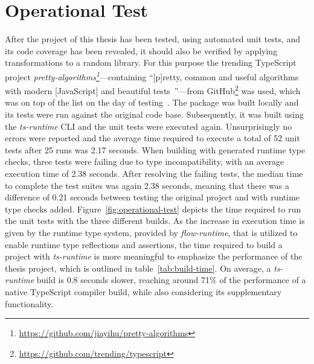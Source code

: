 
\section{Operational Test}
\label{sec:operational-test}

After the project of this thesis has been tested, using automated unit tests, and its code coverage has been revealed, it should also be verified by applying transformations to a random library. For this purpose the trending TypeScript project \emph{pretty-algorithms\footnote{\url{https://github.com/jiayihu/pretty-algorithms}}}---containing ``[p]retty, common and useful algorithms with modern [JavaScript] and beautiful tests~\cite{Evaluation:pretty-algorithms}''---from GitHub\footnote{\url{https://github.com/trending/typescript}} was used, which was on top of the list on the day of testing~\cite{GitHub:Trending:Archive}. The package was built locally and its tests were run against the original code base. Subsequently, it was built using the \emph{ts-runtime} CLI and the unit tests were executed again. Unsurprisingly no errors were reported and the average time required to execute a total of 52 unit tests after 25 runs was 2.17 seconds. When building with generated runtime type checks, three tests were failing due to type incompatibility, with an average execution time of 2.38 seconds. After resolving the failing tests, the median time to complete the test suites was again 2.38 seconds, meaning that there was a difference of 0.21 seconds between testing the original project and with runtime type checks added. Figure~\ref{fig:operational-test} depicts the time required to run the unit tests with the three different builds. As the increase in execution time is given by the runtime type system, provided by \emph{flow-runtime}, that is utilized to enable runtime type reflections and assertions, the time required to build a project with \emph{ts-runtime} is more meaningful to emphasize the performance of the thesis project, which is outlined in table~\ref{tab:build-time}. On average, a \emph{ts-runtime} build is 0.8 seconds slower, reaching around 71\% of the performance of a native TypeScript compiler build, while also considering its supplementary functionality. 
